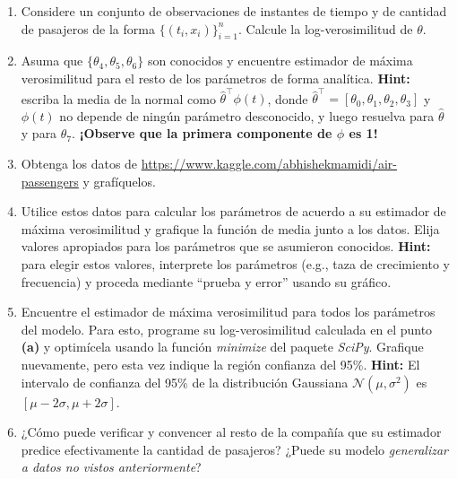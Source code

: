 \documentclass[11pt]{article}
\begin{document}
\begin{enumerate}
\begin{enumerate}
	\item Considere un conjunto de observaciones de instantes de tiempo y de cantidad de pasajeros de la forma $\{(t_i,x_i)\}_{i=1}^n$. Calcule la log-verosimilitud de $\theta$. 
	\item Asuma que $\{\theta_4,\theta_5,\theta_6\}$ son conocidos y encuentre estimador de máxima verosimilitud para el resto de los parámetros de forma analítica. \textbf{Hint:} escriba la media de la normal como $\hat{\theta}^\top\phi(t)$, donde $\hat{\theta}^\top = [\theta_0,\theta_1,\theta_2,\theta_3]$ y $\phi(t)$ no depende de ningún parámetro desconocido, y luego resuelva para $\hat{\theta}$ y para $\theta_7$. \textbf{¡Observe que la primera componente de $\phi$ es 1!}
	\item Obtenga los datos de \url{https://www.kaggle.com/abhishekmamidi/air-passengers} y grafíquelos. 
	\item Utilice estos datos para calcular los parámetros de acuerdo a su estimador de máxima verosimilitud y grafique la función de media junto a los datos. Elija valores apropiados para los parámetros que se asumieron conocidos. \textbf{Hint:} para elegir estos valores, interprete los parámetros (e.g., taza de crecimiento y frecuencia) y proceda mediante ``prueba y error'' usando su gráfico.
	\item Encuentre el estimador de máxima verosimilitud para todos los parámetros del modelo. Para esto, programe su log-verosimilitud calculada en el punto \textbf{(a)} y optimícela usando la función \textit{minimize} del paquete \textit{SciPy}. Grafique nuevamente, pero esta vez indique la región confianza del 95\%. \textbf{Hint:} El intervalo de confianza del 95\% de la distribución Gaussiana $\mathcal{N}(\mu,\sigma^2)$ es $[\mu-2\sigma,\mu+2\sigma]$.
	\item ¿Cómo puede verificar y convencer al resto de la compañía que su estimador  predice efectivamente la cantidad de pasajeros? ¿Puede su modelo \textit{generalizar a datos no vistos anteriormente}?
\end{enumerate}



\end{enumerate}
\end{document}
